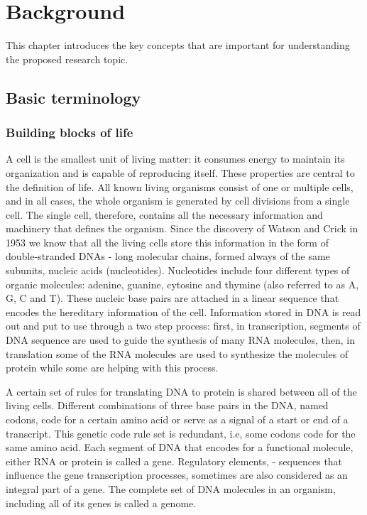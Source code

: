 \documentclass[11pt, a4paper,oneside]{report}
\newcommand{\mychapter}[2]{
    \setcounter{chapter}{#1}
    \setcounter{section}{0}
    \chapter*{#2}
    \addcontentsline{toc}{chapter}{#2}
}
\begin{document}
\mychapter{1}{Background}

This chapter introduces the key concepts that are important for understanding the proposed research topic. 
\section{Basic terminology}
\subsection{Building blocks of life}
A cell is the smallest unit of living matter: it consumes energy to maintain its organization and is capable of reproducing itself. These properties are central to the definition of life. All known living organisms consist of one or multiple cells, and in all cases, the whole organism is generated by cell divisions from a single cell. The single cell, therefore, contains all the necessary information and machinery that defines the organism.  Since the discovery of Watson and Crick in 1953\cite{Watson1974} we know that all the living cells store this information in the form of double-stranded DNAs -  long molecular chains, formed always of the same subunits, nucleic acids (nucleotides). Nucleotides include four different types of organic molecules: adenine, guanine, cytosine and thymine (also referred to as A, G, C and T). These nucleic base pairs are attached  in a linear sequence that encodes the hereditary information of the cell. Information stored in DNA is read out and put to use through a two step process: first, in transcription, segments of DNA sequence are used to guide the synthesis of many RNA molecules, then, in translation some of the RNA molecules are used to synthesize the molecules of protein while some are helping with this process.

 A certain set of rules for translating DNA to protein is shared between all of the living cells.  Different combinations of three base pairs in the DNA, named codons, code for a certain amino acid or serve as a signal of a start or end of a transcript. This genetic code rule set is redundant, i.e, some codons code for the same amino acid\cite{Turanov2009}. Each segment of DNA that encodes for a functional molecule, either RNA or protein is called a gene\cite{Gerstein2007}. Regulatory elements, - sequences that influence the gene transcription processes, sometimes are also considered as an integral part of a gene\cite{lodish2001}. The complete set of DNA molecules in an organism, including all of its genes is called a genome.  
 
\end{document}
